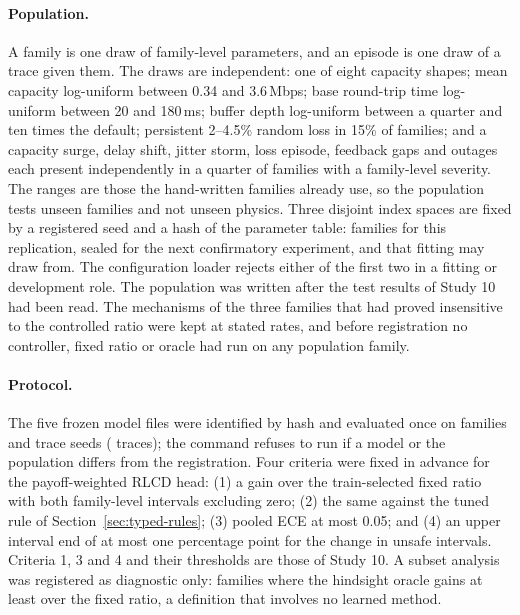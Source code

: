 \documentclass[10pt]{article}
\begin{document}
\paragraph{Population.}
A family is one draw of family-level parameters, and an episode is one draw of a trace given them. The draws are independent: one of eight capacity shapes; mean capacity log-uniform between 0.34 and 3.6\,Mbps; base round-trip time log-uniform between 20 and 180\,ms; buffer depth log-uniform between a quarter and ten times the default; persistent 2--4.5\% random loss in 15\% of families; and a capacity surge, delay shift, jitter storm, loss episode, feedback gaps and outages each present independently in a quarter of families with a family-level severity. The ranges are those the hand-written families already use, so the population tests unseen families and not unseen physics. Three disjoint index spaces are fixed by a registered seed and a hash of the parameter table: \TypedRepFamilies{} families for this replication, \TypedRepSealedFamilies{} sealed for the next confirmatory experiment, and \TypedRepPoolFamilies{} that fitting may draw from. The configuration loader rejects either of the first two in a fitting or development role. The population was written after the test results of Study 10 had been read. The mechanisms of the three families that had proved insensitive to the controlled ratio were kept at stated rates, and before registration no controller, fixed ratio or oracle had run on any population family.

\paragraph{Protocol.}
The five frozen model files were identified by hash and evaluated once on \TypedRepFamilies{} families and \TypedRepTraceSeeds{} trace seeds (\TypedRepTraces{} traces); the command refuses to run if a model or the population differs from the registration. Four criteria were fixed in advance for the payoff-weighted RLCD head: (1) a gain over the train-selected fixed ratio with both family-level intervals excluding zero; (2) the same against the tuned rule of Section~\ref{sec:typed-rules}; (3) pooled ECE at most 0.05; and (4) an upper interval end of at most one percentage point for the change in unsafe intervals. Criteria 1, 3 and 4 and their thresholds are those of Study 10. A subset analysis was registered as diagnostic only: families where the hindsight oracle gains at least \TypedRepSensitiveMargin{} over the fixed ratio, a definition that involves no learned method.
\end{document}
